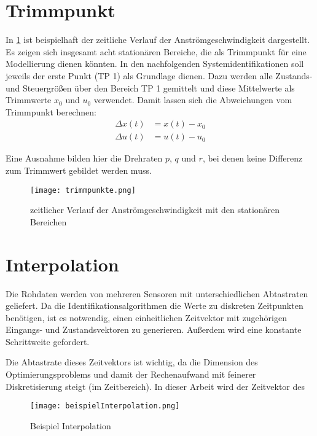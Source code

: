 \section{Trimmpunkt} %
In \cref{fig:trimmpunkte} ist beispielhaft der zeitliche Verlauf der Anströmgeschwindigkeit dargestellt. Es zeigen sich 
insgesamt acht stationären Bereiche, die als Trimmpunkt für eine Modellierung dienen könnten. In den nachfolgenden 
Systemidentifikationen soll jeweils der erste Punkt (TP 1) als Grundlage dienen. Dazu werden alle Zustands- und Steuergrößen 
über den Bereich TP 1 gemittelt und diese Mittelwerte als Trimmwerte $ x_0 $ und $ u_0 $ verwendet. Damit lassen sich die 
Abweichungen vom Trimmpunkt berechnen:
\begin{equation}
	\begin{split}
		\Delta x(t) &= x(t)-x_0\\
		\Delta u(t) &= u(t)-u_0
	\end{split}
\end{equation}

Eine Ausnahme bilden hier die Drehraten $ p $, $ q $ und $ r $, bei denen keine Differenz zum Trimmwert gebildet werden muss.


\begin{figure}[h!]
	\centering
	\texttt{[image: trimmpunkte.png]}
	\caption{zeitlicher Verlauf der Anströmgeschwindigkeit mit den stationären Bereichen}
	\label{fig:trimmpunkte}
\end{figure}




\section{Interpolation} %
Die Rohdaten werden von mehreren Sensoren mit unterschiedlichen Abtastraten geliefert. Da die Identifikationsalgorithmen die 
Werte zu diskreten Zeitpunkten benötigen, ist es notwendig, einen einheitlichen Zeitvektor mit zugehörigen Eingangs- und 
Zustandsvektoren zu generieren. Außerdem wird eine konstante Schrittweite gefordert.

Die Abtastrate dieses Zeitvektors ist wichtig, da die Dimension des Optimierungsproblems und damit der 
Rechenaufwand mit feinerer Diskretisierung steigt (im Zeitbereich). In dieser Arbeit wird der Zeitvektor des 


\begin{figure}[h!]
	\centering
	\texttt{[image: beispielInterpolation.png]}
	\caption{Beispiel Interpolation}
	\label{fig:interpBsp}
\end{figure}

